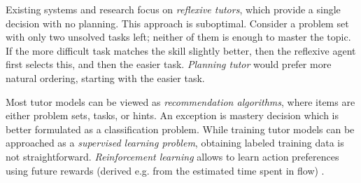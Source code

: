 Existing systems and research focus on \emph{reflexive tutors}, which
provide a single decision with no planning. %
This approach is suboptimal. Consider a problem set with only two
unsolved tasks left; neither of them is enough to master the topic.
If the more difficult task matches the skill slightly better, then
the reflexive agent first selects this, and then the easier task.
\emph{Planning tutor} would prefer more natural ordering,
starting with the easier task.

Most tutor models can be viewed as \emph{recommendation algorithms}, %
where items are either problem sets, tasks, or hints.
An exception is mastery decision which is better formulated as a
classification problem.
While training tutor models can be approached as a \emph{supervised learning problem}, %
obtaining labeled training data is not straightforward.
\emph{Reinforcement learning}  \cite{rl}
allows to learn action preferences using future rewards
(derived e.g. from the estimated time spent in flow)
\cite{rl-for-tutors-evaluation}.





